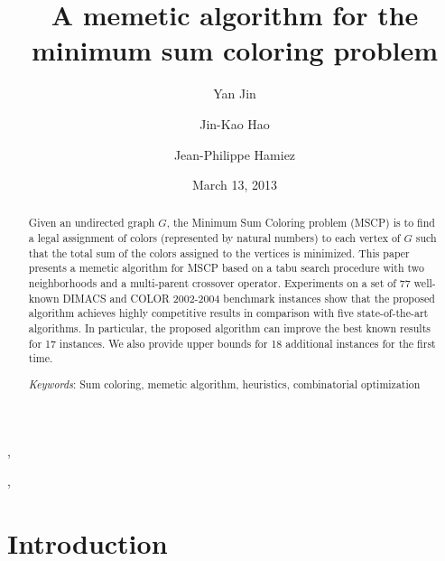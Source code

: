 \documentclass{elsart}
\begin{document}
\begin{frontmatter}

\title{A memetic algorithm for the minimum sum coloring problem}
\author{Yan Jin},
\author{Jin-Kao Hao},
 
\author{Jean-Philippe Hamiez}

\address {LERIA, Universit\'{e} d'Angers, 2 Boulevard Lavoisier, 49045 Angers, France}

\date{March 13, 2013}


\maketitle

\begin{abstract}
Given an undirected graph $G$, the Minimum Sum Coloring problem (MSCP) is to find a legal assignment of colors (represented by natural numbers) to each vertex of $G$ such that the total sum of the colors assigned to the vertices is minimized. This paper presents a memetic algorithm for MSCP based on a tabu search procedure with two neighborhoods and a multi-parent crossover operator. Experiments on a set of 77 well-known DIMACS and COLOR 2002-2004 benchmark instances show that the proposed algorithm achieves highly competitive results in comparison with five state-of-the-art algorithms. In particular, the proposed algorithm can improve the best known results for 17 instances. We also provide upper bounds for 18 additional instances for the first time.

\emph{Keywords}: Sum coloring, memetic algorithm, heuristics, combinatorial optimization
\end{abstract}

\end{frontmatter}

\section{Introduction}
\label{Sec_Intro}
\end{document}
